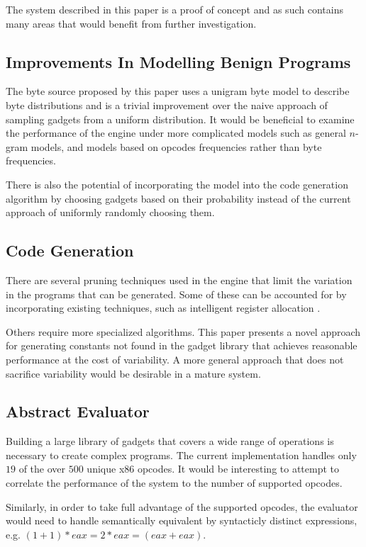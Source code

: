     The system described in this paper is a proof of concept and as such
    contains many areas that would benefit from further investigation.

    \subsection{Improvements In Modelling Benign Programs}

    The byte source proposed by this paper uses a unigram byte model to describe
    byte distributions and is a trivial improvement over the naive approach of
    sampling gadgets from a uniform distribution. It would be beneficial to
    examine the performance of the engine under more complicated models such as
    general $n$-gram models, and models based on opcodes frequencies rather than
    byte frequencies.

    There is also the potential of incorporating the model into the code
    generation algorithm by choosing gadgets based on their probability instead
    of the current approach of uniformly randomly choosing them.

    \subsection{Code Generation}

    There are several pruning techniques used in the engine that limit the
    variation in the programs that can be generated. Some of these can be
    accounted for by incorporating existing techniques, such as intelligent
    register allocation \cite{register-coloring}.

    Others require more specialized algorithms. This paper presents a novel
    approach for generating constants not found in the gadget library that
    achieves reasonable performance at the cost of variability. A more general
    approach that does not sacrifice variability would be desirable in a mature
    system.

    \subsection{Abstract Evaluator}

    Building a large library of gadgets that covers a wide range of operations
    is necessary to create complex programs. The current implementation handles
    only $19$ of the over $500$ unique x86 opcodes. It would be
    interesting to attempt to correlate the performance of the system to the
    number of supported opcodes.

    Similarly, in order to take full advantage of the supported opcodes, the
    evaluator would need to handle semantically equivalent by syntacticly
    distinct expressions, e.g. $(1+1)*eax = 2*eax = (eax+eax)$.

%
